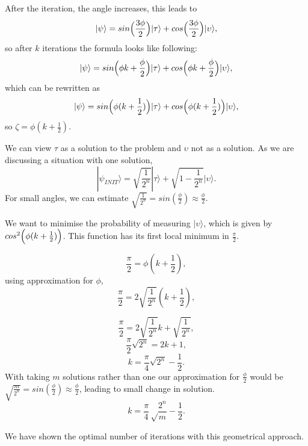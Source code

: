 After the iteration, the angle increases, this leads to 
\begin{equation}
    |\psi\rangle = sin\Bigl(\frac{3\phi}{2}\Bigr)|\tau \rangle  + cos\Bigl(\frac{3\phi}{2}\Bigr)|\upsilon\rangle,
\end{equation}
so after $k$ iterations the formula looks like following:
\begin{equation}
        |\psi\rangle = sin\Bigl(\phi k+\frac{\phi}{2}\Bigr)|\tau \rangle  + cos\Bigl(\phi k+\frac{\phi}{2}\Bigr)|\upsilon\rangle,
\end{equation}
which can be rewritten as
\begin{equation}
        |\psi\rangle = sin \Bigl(\phi (k+\frac{1}{2})\Bigr)|\tau \rangle  + cos\Bigl(\phi (k+\frac{1}{2})\Bigr)|\upsilon\rangle,
\end{equation}
so $\zeta = \phi (k+\frac{1}{2}).$

We can view $\tau$ as a solution to the problem and $ \upsilon $ not as a solution. As we are discussing a situation with one solution,
\begin{equation}
    |\psi_{INIT}\rangle=\sqrt{\frac{1}{2^n}}|\tau\rangle+\sqrt{1-\frac{1}{2^n}}|\upsilon\rangle.
\end{equation}
For small angles, we can estimate $\sqrt{\frac{1}{2^n}}=sin(\frac{\phi}{2})\approx\frac{\phi}{2}$.

We want to minimise the probability of measuring $|\upsilon\rangle$, which is given by $cos^2\Bigl(\phi (k+\frac{1}{2})\Bigr)$. This function has its first local minimum in $\frac{\pi}{2}$.

\begin{equation}
    \frac{\pi}{2} = \phi (k+\frac{1}{2}),
\end{equation}
using approximation for $\phi$,
\begin{equation}
    \frac{\pi}{2} = 2\sqrt{\frac{1}{2^n}} (k+\frac{1}{2}),
\end{equation}

\begin{equation}
    \frac{\pi}{2} = 2\sqrt{\frac{1}{2^n}} k+\sqrt{\frac{1}{2^n}},
\end{equation}
\begin{equation}
    \frac{\pi}{2}\sqrt{2^n} = 2k+1,
\end{equation}
\begin{equation}
    k=\frac{\pi}{4}\sqrt{2^n}-\frac{1}{2}.
\end{equation}
With taking $m$ solutions rather than one our approximation for $\frac{\phi}{2}$ would be $\sqrt{\frac{m}{2^n}}=sin(\frac{\phi}{2})\approx\frac{\phi}{2}$, leading to small change in solution.
\begin{equation} \label{optimal_iter}
    k=\frac{\pi}{4}\sqrt\frac{2^n}{m}-\frac{1}{2}.
\end{equation}

We have shown the optimal number of iterations with this geometrical approach.
